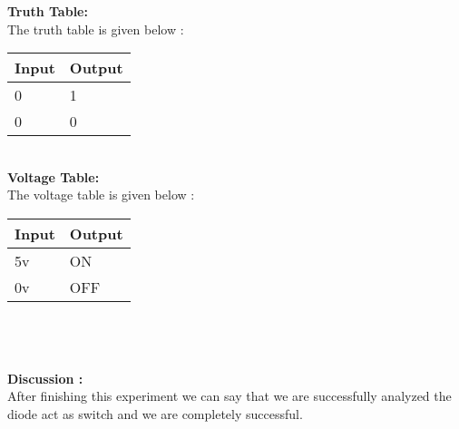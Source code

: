 \documentclass[a4paper,10pt]{article}
\begin{document}
	\textbf{{\large Truth Table:}}\\The truth table is given below : \\
	\begin{tabular}{|p{3cm}||p{3cm}||}
		\hline
		\bf{Input}& \bf{Output} \\
		\hline
		0 & 1 \\
		\hline
		0 & 0\\
		\hline
		\end{tabular}
	\\
	
	
	\textbf{{\large Voltage Table:}} \\The voltage table is given below : \\
	\begin{tabular}{|p{3cm}||p{3cm}||}
		\hline
		\bf{Input}& \bf{Output} \\
		\hline
		5v & ON \\
		\hline
		0v & OFF\\
		\hline
	\end{tabular} \\
\\
\vspace{5mm} \\ 
   \textbf {{\large Discussion :}} \\ After finishing this experiment we can say that we are successfully analyzed the diode act as switch and we are completely successful.
	
	
	
\end{document}

